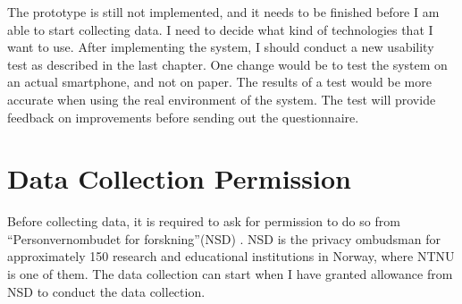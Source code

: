 	The prototype is still not implemented, and it needs to be finished before I am able to start collecting data. I need to decide what kind of technologies that I want to use. After implementing the system, I should conduct a new usability test as described in the last chapter. One change would be to test the system on an actual smartphone, and not on paper. The results of a test would be more accurate when using the real environment of the system. The test will provide feedback on improvements before sending out the questionnaire.

	\section{Data Collection Permission}

	Before collecting data, it is required to ask for permission to do so from ``Personvernombudet for forskning''(NSD) \cite{personvernombud}. NSD is the privacy ombudsman for approximately 150 research and educational institutions in Norway, where NTNU is one of them. The data collection can start when I have granted allowance from NSD to conduct the data collection.